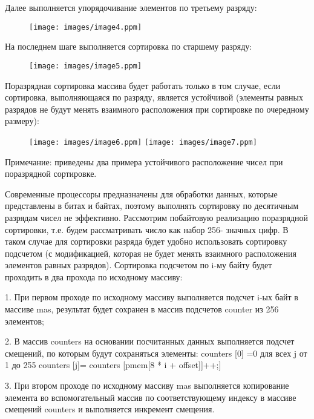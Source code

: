 \documentclass{report}
\begin{document}
Далее выполняется упорядочивание элементов по третьему разряду:

\begin{figure}[htp]
    \centering
    \texttt{[image: images/image4.ppm]}
    \label{fig:galaxy}
\end{figure}

На последнем шаге выполняется сортировка по старшему разряду:

\begin{figure}[htp]
    \centering
    \texttt{[image: images/image5.ppm]}
    \label{fig:galaxy}
\end{figure}

Поразрядная сортировка массива будет работать только в том случае, если
сортировка, выполняющаяся по разряду, является устойчивой (элементы равных разрядов не будут менять взаимного расположения при сортировке по очередному размеру): 


\begin{figure}[htp]
    \texttt{[image: images/image6.ppm]}
    \texttt{[image: images/image7.ppm]}
    \label{fig:galaxy}
\end{figure}
Примечание: приведены два примера устойчивого расположение чисел при поразрядной сортировке.

\newpage

Современные процессоры предназначены для обработки данных, которые
представлены в битах и байтах, поэтому выполнять сортировку по десятичным
разрядам чисел не эффективно. Рассмотрим побайтовую реализацию
поразрядной сортировки, т.е. будем рассматривать число как набор 256-
значных цифр. В таком случае для сортировки разряда будет удобно
использовать сортировку подсчетом (с модификацией, которая не будет
менять взаимного расположения элементов равных разрядов).
Сортировка подсчетом по i-му байту будет проходить в два прохода по
исходному массиву:

1.	При первом проходе по исходному массиву выполняется подсчет
i-ых байт в массиве mas, результат будет сохранен в массив подсчетов
counter из 256 элементов;

2.	В массив counters на основании посчитанных данных выполняется
подсчет смещений, по которым будут сохраняться элементы:
counters [0] =0 для всех j от 1 до 255 counters [j]= counters [pmem[8 * i + offset]]++;]

3.	При втором проходе по исходному массиву mas выполняется
копирование элемента во вспомогательный массив по соответствующему индексу в массиве смещений counters и выполняется
инкремент смещения.
\end{document}
